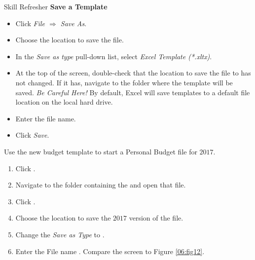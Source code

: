\begin{center}
	\begin{sklbox}{Skill Refresher}
		\textbf{Save a Template}
		\\
		\begin{itemize}
			\setlength{\itemsep}{0pt}
			\setlength{\parskip}{0pt}
			\setlength{\parsep}{0pt}

			\item Click \textit{File $ \Rightarrow $ Save As}.
			\item Choose the location to save the file.
			\item In the \textit{Save as type} pull-down list, select \textit{Excel Template (*.xltx)}.
			\item At the top of the screen, double-check that the location to save the file to has not changed. If it has, navigate to the folder where the template will be saved. \textit{Be Careful Here!} By default, Excel will save templates to a default file location on the local hard drive.
			\item Enter the file name.
			\item Click \textit{Save}.
			
		\end{itemize}
	\end{sklbox}
\end{center}

Use the new budget template to start a Personal Budget file for $ 2017 $. 

\begin{enumerate}
	\item Click .
	\item Navigate to the folder containing the  and open that file.
	\item Click .
	\item Choose the location to save the $ 2017 $ version of the file.
	\item Change the \textit{Save as Type} to .
	\item Enter the File name . Compare the screen to Figure \ref{06:fig12}.
\end{enumerate}

